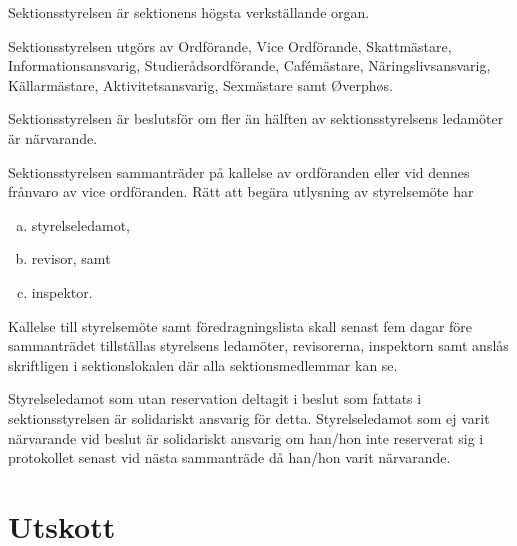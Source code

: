 \documentclass[stadgar]{dsekprotokoll}
\begin{document}
\begin{stadgeavsnitt}


Sektionsstyrelsen är sektionens högsta verkställande organ.


Sektionsstyrelsen utgörs av Ordförande, Vice Ordförande, Skattmästare, Informationsansvarig, Studierådsordförande, Cafémästare, Näringslivsansvarig, Källarmästare, Aktivitetsansvarig, Sexmästare samt Øverphøs.


Sektionsstyrelsen är beslutsför om fler än hälften av sektionsstyrelsens
ledamöter är närvarande.


Sektionsstyrelsen sammanträder på kallelse av ordföranden eller vid dennes
frånvaro av vice ordföranden. Rätt att begära utlysning av styrelsemöte
har
\begin{enumerate}[a)]
\item styrelseledamot,
\item revisor, samt
\item inspektor.
\end{enumerate}


Kallelse till styrelsemöte samt föredragningslista skall senast fem dagar före sammanträdet tillställas styrelsens ledamöter,
revisorerna, inspektorn samt anslås skriftligen i sektionslokalen där alla sektionsmedlemmar kan se.


Styrelseledamot som utan reservation deltagit i beslut som fattats i
sektionsstyrelsen är solidariskt ansvarig för detta. Styrelseledamot som ej
varit närvarande vid beslut är solidariskt ansvarig om han/hon inte
reserverat sig i protokollet senast vid nästa sammanträde då han/hon varit
närvarande.

\end{stadgeavsnitt}

\section{Utskott}
\end{document}
